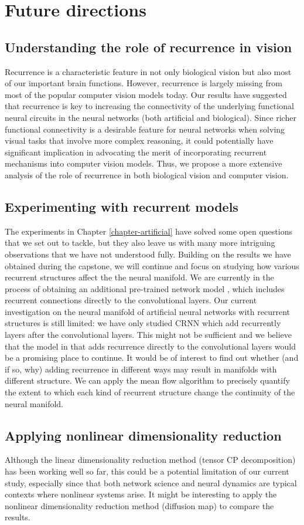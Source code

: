 \section{Future directions}
\subsection{Understanding the role of recurrence in vision}
Recurrence is a characteristic feature in not only biological vision but also most of our important brain functions. However, recurrence is largely missing from most of the popular computer vision models today. Our results have suggested that recurrence is key to increasing the connectivity of the underlying functional neural circuits in the neural networks (both artificial and biological). Since richer functional connectivity is a desirable feature for neural networks when solving visual tasks that involve more complex reasoning, it could potentially have significant implication in advocating the merit of incorporating recurrent mechanisms into computer vision models. Thus, we propose a more extensive analysis of the role of recurrence in both biological vision and computer vision. 

\subsection{Experimenting with recurrent models}
The experiments in Chapter \ref{chapter-artificial} have solved some open questions that we set out to tackle, but they also leave us with many more intriguing observations that we have not understood fully. Building on the results we have obtained during the capstone, we will continue and focus on studying how various recurrent structures affect the the neural manifold. We are currently in the process of obtaining an additional pre-trained network model \cite{serre-recurrence}, which includes recurrent connections directly to the convolutional layers. Our current investigation on the neural manifold of artificial neural networks with recurrent structures is still limited: we have only studied CRNN which add recurrently layers after the convolutional layers. This might not be sufficient and we believe that the model in \cite{serre-recurrence} that adds recurrence directly to the convolutional layers would be a promising place to continue. It would be of interest to find out whether (and if so, why) adding recurrence in different ways may result in manifolds with different structure. We can apply the mean flow algorithm to precisely quantify the extent to which each kind of recurrent structure change the continuity of the neural manifold.

\subsection{Applying nonlinear dimensionality reduction}
Although the linear dimensionality reduction method (tensor CP decomposition) has been working well so far, this could be a potential limitation of our current study, especially since that both network science and neural dynamics are typical contexts where nonlinear systems arise. It might be interesting to apply the nonlinear dimensionality reduction method (diffusion map) to compare the results.  